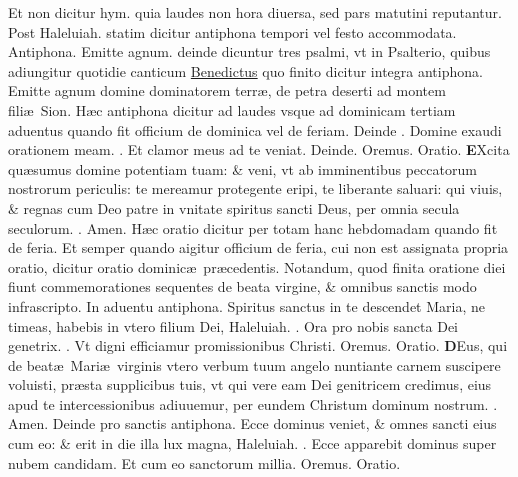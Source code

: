 \documentclass[a5paper,10pt]{book}
\makeatletter
\DeclareRobustCommand{\Vbar}{\vers@resp{-0.1em}{V}}
\DeclareRobustCommand{\Rbar}{\vers@resp{0pt}{R}}
\newcommand{\vers@resp@sym}{\raisebox{0.2ex}{\rotatebox[origin=c]{-20}{$\m@th\rceil$}}}
\newcommand{\vers@resp}[2]{%
  {\ooalign{\hidewidth\kern#1\vers@resp@sym\hidewidth\cr#2\cr}}%
}%
\def\ae{æ}
\makeatother
\begin{document}
\begin{multicols*}{2}
\newline \color{red} Et non dicitur hym. quia laudes non hora diuersa, sed pars matutini reputantur. Post \color{black} Haleluiah. \color{red} statim dicitur antiphona tempori vel festo accommodata. Antiphona. \color{black} Emitte agnum. \color{red} deinde dicuntur tres psalmi, vt in Psalterio, quibus adiungitur quotidie canticum \color{black} \hyperlink{Benedictus}{Benedictus} \color{red} quo finito dicitur integra antiphona. \color{black} Emitte agnum domine dominatorem terr\ae , de petra deserti ad montem fili\ae \ Sion. \color{red} H\ae c antiphona dicitur ad laudes vsque ad dominicam tertiam aduentus quando fit officium de dominica vel de feriam. Deinde \Vbar . \color{black} Domine exaudi orationem meam. \color{red} \Rbar . \color{black} Et clamor meus ad te veniat. \color{red} Deinde. \color{black} Oremus. \color{red} Oratio. \color{black}
\vspace{-.5em}
\lettrine[lines=2]{\bfseries \color{red} E}{}Xcita qu\ae sumus domine potentiam tuam: \& veni, vt ab imminentibus peccatorum nostrorum periculis: te mereamur protegente eripi, te liberante saluari: qui viuis, \& regnas cum Deo patre in vnitate spiritus sancti Deus, per omnia secula seculorum. \color{red} \Rbar . \color{black} Amen.
\newline \color{red} H\ae c oratio dicitur per totam hanc hebdomadam quando fit de feria. Et semper quando aigitur officium de feria, cui non est assignata propria oratio, dicitur oratio dominic\ae \ pr\ae cedentis. Notandum, quod finita oratione diei fiunt commemorationes sequentes de beata virgine, \& omnibus sanctis modo infrascripto. In aduentu antiphona. \color{black} Spiritus sanctus in te descendet Maria, ne timeas, habebis in vtero filium Dei, 
Haleluiah. \color{red} \Vbar . \color{black} Ora pro nobis sancta Dei genetrix. \color{red} \Rbar . \color{black} Vt digni efficiamur promissionibus Christi. \color{red} O\color{black}remus. \color{red} Oratio. \color{black}
\vspace{-.5em}
\lettrine[lines=2]{\bfseries \color{red} D}{}Eus, qui de beat\ae \ Mari\ae \ virginis vtero verbum tuum angelo nuntiante carnem suscipere voluisti, pr\ae sta supplicibus tuis, vt qui vere eam Dei genitricem credimus, eius apud te intercessionibus adiuuemur, per eundem Christum dominum nostrum. \color{red} \Rbar . \color{black} Amen.
\newline \color{red} Deinde pro sanctis antiphona. \color{black} Ecce dominus veniet, \& omnes sancti eius cum eo: \& erit in die illa lux magna, Haleluiah. \color{red} \Vbar . \color{black} Ecce apparebit dominus super nubem candidam. \color{red} Et cum eo sanctorum millia. \color{black} Oremus. \color{red} Oratio. \color{black}

\end{multicols*}
\end{document}

